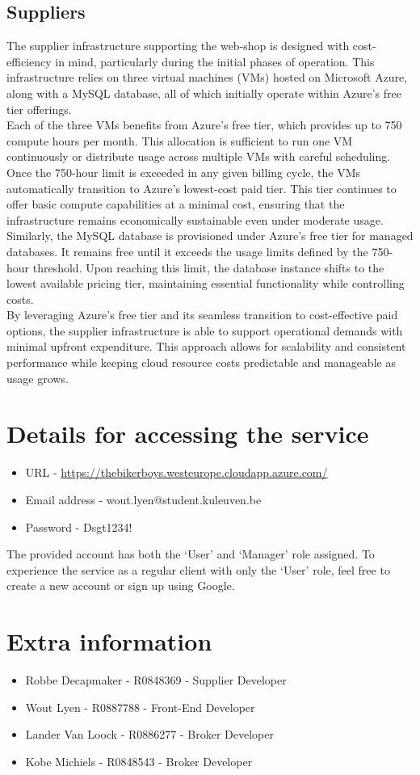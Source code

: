 \documentclass[10pt,a4paper,kul]{kulakarticle} %
\begin{document}
		\subsection{Suppliers}
			The supplier infrastructure supporting the web-shop is designed with cost-efficiency in mind, particularly during the initial phases of operation. This infrastructure relies on three virtual machines (VMs) hosted on Microsoft Azure, along with a MySQL database, all of which initially operate within Azure's free tier offerings.\\
			Each of the three VMs benefits from Azure’s free tier, which provides up to 750 compute hours per month. This allocation is sufficient to run one VM continuously or distribute usage across multiple VMs with careful scheduling. Once the 750-hour limit is exceeded in any given billing cycle, the VMs automatically transition to Azure’s lowest-cost paid tier. This tier continues to offer basic compute capabilities at a minimal cost, ensuring that the infrastructure remains economically sustainable even under moderate usage.\\
			Similarly, the MySQL database is provisioned under Azure’s free tier for managed databases. It remains free until it exceeds the usage limits defined by the 750-hour threshold. Upon reaching this limit, the database instance shifts to the lowest available pricing tier, maintaining essential functionality while controlling costs.\\
			By leveraging Azure’s free tier and its seamless transition to cost-effective paid options, the supplier infrastructure is able to support operational demands with minimal upfront expenditure. This approach allows for scalability and consistent performance while keeping cloud resource costs predictable and manageable as usage grows.
			
	\section{Details for accessing the service}
	
	\begin{itemize}
		\item URL - \url{https://thebikerboys.westeurope.cloudapp.azure.com/}
		\item Email address - wout.lyen@student.kuleuven.be
		\item Password - Dsgt1234!
	\end{itemize}
	
	\noindent The provided account has both the `User' and `Manager' role assigned. To experience the service as a regular client with only the `User' role, feel free to create a new account or sign up using Google.
	
\newpage
  \section{Extra information}
  \begin{itemize}
    \item Robbe Decapmaker - R0848369 - Supplier Developer
    \item Wout Lyen - R0887788 - Front-End Developer
    \item Lander Van Loock - R0886277 - Broker Developer
    \item Kobe Michiels - R0848543 - Broker Developer
  \end{itemize}
  
\end{document}
